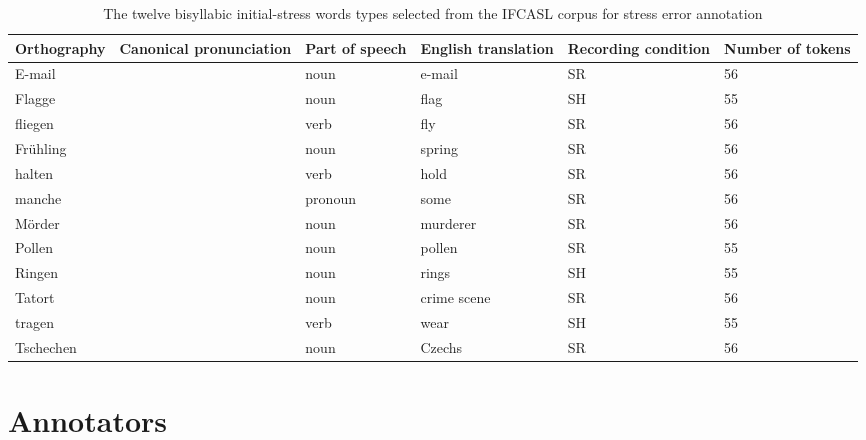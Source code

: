 	\begin{table}[htb]
		\centering
		\caption{The twelve bisyllabic initial-stress words types selected from the IFCASL corpus for stress error annotation %
		}
		
		\begin{tabularx}{\textwidth}{lXXXXX}
		\toprule
		
		Orthography & 
		Canonical \linebreak pronunciation & 
		Part of speech & 
		English \linebreak translation & 
		Recording condition & 
		Number \linebreak of tokens \\%
		
		\midrule
		E-mail	&	\TODO{prons} &	noun &	e-mail &	SR 	&	56	\\
		Flagge	&	&	noun &	 flag &	SH	&	55	\\
		fliegen	&	&	verb &	fly &	SR		& 56	\\
		Frühling	&	& noun	&	spring &	SR		&	56	\\
		halten	&	&	verb &	hold &	SR 	&	56	\\
		manche	&	&	pronoun &	some & 	SR 	&	56	\\
		Mörder	&	&	noun &	murderer &	SR 	&	56	\\
		Pollen	&	&	noun &	pollen &	SR 	& 	55	\\
		Ringen	&	&	noun &	rings &	SH	&	55	\\
		Tatort	&	&	noun &	crime scene & 	SR 	&		56	\\
		tragen	&	&	verb &	wear &	SH	&	55	\\
		Tschechen	&	& noun	&	Czechs	&	SR		& 56	\\
		\bottomrule
		\end{tabularx}
		\label{tab:bisyllwords}
	\end{table}
	
	\section{Annotators}
	\label{sec:lexstress:annotators}
	
